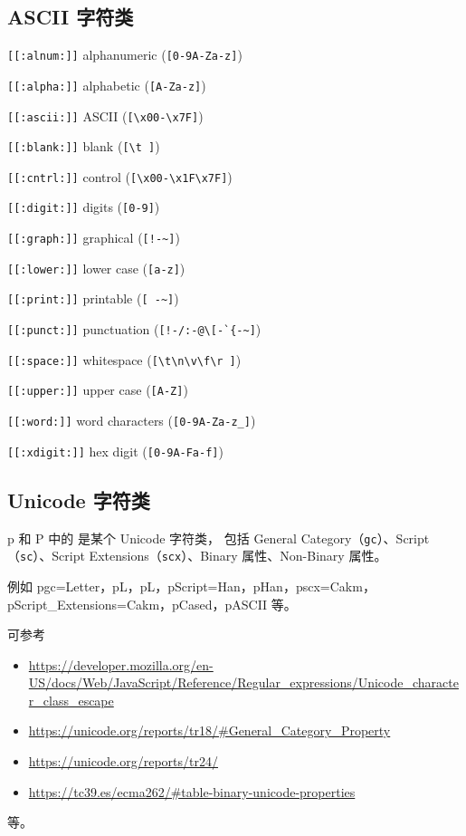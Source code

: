 \documentclass[class=article,openany]{cusdoc}[2025/10/10]
\begin{document}
\subsection{ASCII 字符类}

\begin{regexsyntax}
\item[\texttt{[[:alnum:]]}]    alphanumeric (\verb&[0-9A-Za-z]&)
\item[\texttt{[[:alpha:]]}]    alphabetic (\verb&[A-Za-z]&)
\item[\texttt{[[:ascii:]]}]    ASCII (\verb&[\x00-\x7F]&)
\item[\texttt{[[:blank:]]}]    blank (\verb&[\t ]&)
\item[\texttt{[[:cntrl:]]}]    control (\verb&[\x00-\x1F\x7F]&)
\item[\texttt{[[:digit:]]}]    digits (\verb&[0-9]&)
\item[\texttt{[[:graph:]]}]    graphical (\verb&[!-~]&)
\item[\texttt{[[:lower:]]}]    lower case (\verb&[a-z]&)
\item[\texttt{[[:print:]]}]    printable (\verb&[ -~]&)
\item[\texttt{[[:punct:]]}]    punctuation (\verb&[!-/:-@\[-`{-~]&) \iffalse)\fi%
\item[\texttt{[[:space:]]}]    whitespace (\verb&[\t\n\v\f\r ]&)
\item[\texttt{[[:upper:]]}]    upper case (\verb&[A-Z]&)
\item[\texttt{[[:word:]]}]     word characters (\verb&[0-9A-Za-z_]&)
\item[\texttt{[[:xdigit:]]}]   hex digit (\verb&[0-9A-Fa-f]&)
\end{regexsyntax}

\subsection{Unicode 字符类}

\escape p{} 和 \escape P{} 中的  是某个 Unicode 字符类，
包括 General Category（\texttt{gc}）、Script（\texttt{sc}）、Script Extensions（\texttt{scx}）、Binary 属性、Non-Binary 属性。

{\def\p{\escape p}
例如 \p{gc=Letter}，\p{L}，\p L，\p{Script=Han}，\p{Han}，\p{scx=Cakm}，\p{Script_Extensions=Cakm}，\p{Cased}，\p{ASCII} 等。
}

可参考
\begin{itemize}
\item \url{https://developer.mozilla.org/en-US/docs/Web/JavaScript/Reference/Regular_expressions/Unicode_character_class_escape}
\item \url{https://unicode.org/reports/tr18/#General_Category_Property}
\item \url{https://unicode.org/reports/tr24/}
\item \url{https://tc39.es/ecma262/#table-binary-unicode-properties}
\end{itemize}
等。
\end{document}
